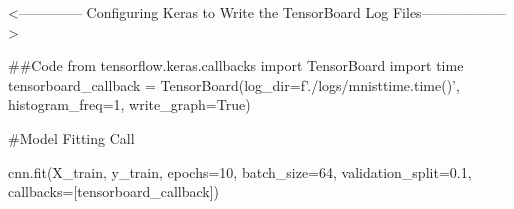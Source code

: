 <-------------- Configuring Keras to Write the TensorBoard Log Files------------------>

##Code
from tensorflow.keras.callbacks import TensorBoard
import time
tensorboard_callback = TensorBoard(log_dir=f'./logs/mnist{time.time()}',
histogram_freq=1, write_graph=True)

#Model Fitting Call

cnn.fit(X_train, y_train, epochs=10, batch_size=64,
validation_split=0.1, callbacks=[tensorboard_callback])

